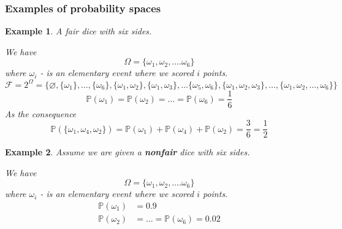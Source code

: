 \documentclass[10pt]{article}
\newtheorem*{example}{Example}
\begin{document}
\subsubsection{Examples of probability spaces}

\begin{example}
A fair dice with six sides.

We have
$$
\Omega=\{\omega_1,\omega_2,\ldots.\omega_6\}
$$
where $\omega_i$ - is an elementary event where we scored $i$ points.
$$
\mathcal{F}=2^\Omega=\{\varnothing,\{\omega_1\},\ldots,\{\omega_6\},\{\omega_1,\omega_2\},\{\omega_1,\omega_3\},\ldots\{\omega_5,\omega_6\},\{\omega_1,\omega_2,\omega_3\},\ldots,\{\omega_1,\omega_2,\ldots,\omega_6\}\}
$$
$$
\mathbb{P}(\omega_1)=\mathbb{P}(\omega_2)=\ldots=\mathbb{P}(\omega_6)=\frac{1}{6}
$$
As the consequence
$$
\mathbb{P}(\{\omega_1, \omega_4,\omega_2\})=\mathbb{P}(\omega_1)+\mathbb{P}(\omega_4)+\mathbb{P}(\omega_2)=\frac{3}{6}=\frac{1}{2}
$$
\end{example}

\begin{example}

Assume we are given a \textbf{nonfair} dice with six sides.

We have
$$
\Omega=\{\omega_1,\omega_2,\ldots.\omega_6\}
$$
where $\omega_i$ - is an elementary event where we scored $i$ points.
\begin{align}
\mathbb{P}(\omega_1)&=0.9\\
\mathbb{P}(\omega_2)&=\ldots=\mathbb{P}(\omega_6)=0.02
\end{align}

\end{example}
\end{document}
